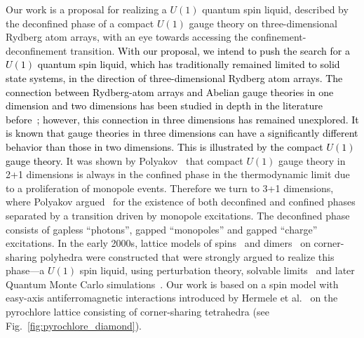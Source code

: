 \documentclass[twocolumn,superscriptaddress,amsmath,amssymb,aps,prx,nofootinbib]{revtex4-2}
\newcommand{\newtext}[1]{\textcolor{black}{#1}}
\begin{document}
Our work is a proposal for realizing a $U(1)$ quantum spin liquid, described by the deconfined phase of a compact $U(1)$ gauge theory on three-dimensional Rydberg atom  arrays,  with an eye towards accessing the confinement-deconfinement transition. 
\newtext{With our proposal, we intend to push the search for a $U(1)$ quantum spin liquid, which has traditionally remained limited to solid state systems, in the direction of three-dimensional Rydberg atom arrays.
The connection between Rydberg-atom arrays and Abelian gauge theories in one dimension and two dimensions has been studied in depth in the literature before~\cite{cheng2024emergent, ohler2022self, surace2020lattice, cheng2023gauge}; however, this connection in three dimensions has remained unexplored. It is known that gauge theories in three dimensions can have a significantly different behavior than those in two dimensions. This is illustrated by the compact $U(1)$ gauge theory.}
It was shown by Polyakov~\cite{polyakovCompactGaugeFields1975,polyakov1977} that compact $U(1)$ gauge theory in 2+1 dimensions is always in the confined phase in the thermodynamic limit due to a proliferation of monopole events. Therefore we turn to 3+1 dimensions, where Polyakov argued~\cite{polyakov1977} for the existence of both deconfined and confined phases separated by a transition driven by monopole excitations. The deconfined phase consists of gapless ``photons'', gapped ``monopoles'' and gapped ``charge'' excitations. In the early 2000s, lattice models of spins~\cite{hermele2004} and dimers~\cite{huse2003} on corner-sharing polyhedra were constructed that were strongly argued to realize this phase---a $U(1)$ spin liquid, using perturbation theory, solvable limits~\cite{hermele2004} and later Quantum Monte Carlo simulations~\cite{banerjee2008,shannon2012}. Our work is based on a spin model with easy-axis antiferromagnetic interactions introduced by Hermele et al.~\cite{hermele2004} on the pyrochlore lattice consisting of corner-sharing tetrahedra (see Fig.~\ref{fig:pyrochlore_diamond}). 
\end{document}
